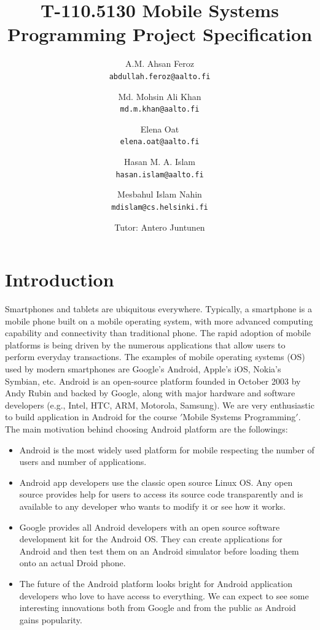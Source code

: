\documentclass[10pt,a4paper]{report}
\author{A.M. Ahsan Feroz \\
\texttt{abdullah.feroz@aalto.fi}
\and
Md. Mohsin Ali Khan \\
\texttt{md.m.khan@aalto.fi}
\and
Elena Oat\\
\texttt{elena.oat@aalto.fi}
\and
Hasan M. A. Islam \\
\texttt{hasan.islam@aalto.fi}
\and
Mesbahul Islam Nahin\\
\texttt{mdislam@cs.helsinki.fi} \\
\and
Tutor: Antero Juntunen
}
\title{T-110.5130 Mobile Systems Programming Project Specification}
\begin{document}
\maketitle
\chapter{Introduction}
Smartphones and tablets are ubiquitous everywhere. Typically, a smartphone is a mobile phone built on a mobile operating system, with more advanced computing capability and connectivity than traditional phone. The rapid adoption of mobile platforms is being driven by the numerous applications that allow users to perform everyday transactions. The examples of mobile operating systems (OS) used by modern smartphones are Google's Android, Apple's iOS, Nokia's Symbian, etc. Android is an open-source platform founded in October 2003 by Andy Rubin and backed by Google, along with major hardware and software developers (e.g., Intel, HTC, ARM, Motorola, Samsung). We are very enthusiastic to build application in Android for the course $'$Mobile Systems Programming$'$. The main motivation behind choosing Android platform are the followings:

 \begin{itemize}
   \item Android is the most widely used platform for mobile respecting the number of users and number of applications.
   \item Android app developers use the classic open source Linux OS. Any open source provides help for users to access its source code transparently and is available to any developer who wants to modify it or see how it works.
   \item Google provides all Android developers with an open source software development kit for the Android OS. They can create applications for Android and then test them on an Android simulator before loading them onto an actual Droid phone.
   \item The future of the Android platform looks bright for Android application developers who love to have access to everything. We can expect to see some interesting innovations both from Google and from the public as Android gains popularity.
 \end{itemize}
\end{document}
